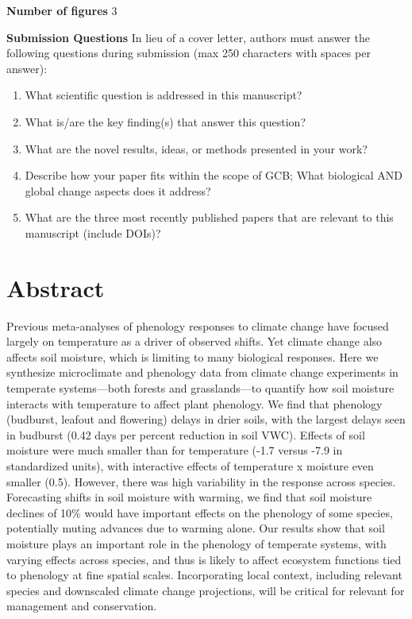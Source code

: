 \documentclass{article}
\begin{document}



\textbf{Number of figures} 3

\textbf{Submission Questions} In lieu of a cover letter, authors must answer the following questions during submission (max 250 characters with spaces per answer):
\begin{enumerate}
\item What scientific question is addressed in this manuscript?
\item What is/are the key finding(s) that answer this question?
\item What are the novel results, ideas, or methods presented in your work?
\item Describe how your paper fits within the scope of GCB; What biological AND global change aspects does it address?
\item What are the three most recently published papers that are relevant to this manuscript (include DOIs)?
\end{enumerate}



\linenumbers

\section*{Abstract} 
Previous meta-analyses of phenology responses to climate change have focused largely on temperature as a driver of observed shifts. Yet climate change also affects soil moisture, which is limiting to many biological responses. Here we synthesize microclimate and phenology data from climate change experiments in temperate systems---both forests and grasslands---to quantify how soil moisture interacts with temperature to affect plant phenology. 
We find that phenology (budburst, leafout and flowering) delays in drier soils, with the largest delays seen in budburst (0.42 days per percent reduction in soil VWC). Effects of soil moisture were much smaller than for temperature (-1.7 versus -7.9 in standardized units), with interactive effects of temperature x moisture even smaller (0.5). However, there was high variability in the response across species. Forecasting shifts in soil moisture with warming, we find that soil moisture declines of 10\% would have important effects on the phenology of some species, potentially muting advances due to warming alone. Our results show that soil moisture plays an important role in the phenology of temperate systems, with varying effects across species, and thus is likely to affect ecosystem functions tied to phenology at fine spatial scales. Incorporating local context, including relevant species and downscaled climate change projections, will be critical for relevant for management and conservation.
\end{document}
